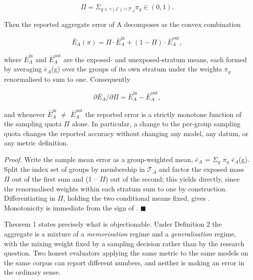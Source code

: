\begin{equation}
\label{eq:38}
\Pi = \Sigma _{g \in \gamma (\mathcal{E}) \cap \mathcal{T}_A} \pi _g \in (0, 1).
\end{equation}

Then the reported aggregate error of A decomposes as the convex combination

\begin{equation}
\label{eq:39}
\bar{E}_A(\pi ) = \Pi \cdot \bar{E}_A^{\mathrm{in}} + (1 - \Pi ) \cdot \bar{E}_A^{\mathrm{out}},
\end{equation}

where $\bar{E}_{A}^{\mathrm{in}}$ and $\bar{E}_{A}^{\mathrm{out}}$ are the exposed- and unexposed-stratum means, each formed by averaging $\bar{e}_{A}$(g) over the groups of its own stratum under the weights $\pi_{g}$ renormalised to sum to one. Consequently

\begin{equation}
\label{eq:40}
\partial \bar{E}_A / \partial \Pi = \bar{E}_A^{\mathrm{in}} - \bar{E}_A^{\mathrm{out}} ,
\end{equation}

and whenever $\bar{E}_{A}^{\mathrm{in}}$ $\neq$ $\bar{E}_{A}^{\mathrm{out}}$ the reported error is a strictly monotone function of the sampling quota $\Pi$ alone. In particular, a change to the per-group sampling quota changes the reported accuracy without changing any model, any datum, or any metric definition.

\emph{Proof.} Write the sample mean error as a group-weighted mean, $\bar{e}_{A}$ = $\Sigma_{g}$ $\pi_{g}$ $\bar{e}_{A}$(g). Split the index set of groups by membership in $\mathcal{T}_{A}$ and factor the exposed mass $\Pi$ out of the first sum and (1 -- $\Pi$) out of the second; this yields  directly, since the renormalised weights within each stratum sum to one by construction. Differentiating  in $\Pi$, holding the two conditional means fixed, gives . Monotonicity is immediate from the sign of . $\blacksquare$

Theorem 1 states precisely what is objectionable. Under Definition 2 the aggregate is a mixture of a \emph{memorisation} regime and a \emph{generalisation} regime, with the mixing weight fixed by a sampling decision rather than by the research question. Two honest evaluators applying the same metric to the same models on the same corpus can report different numbers, and neither is making an error in the ordinary sense.


